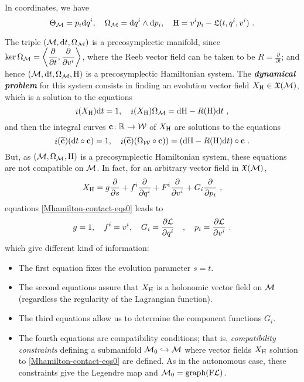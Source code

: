 \documentclass[12pt]{report}
\def\beq{\begin{equation}}
\def\eeq{\end{equation}}
\def\dst{\displaystyle}
\def\derpar#1#2{\frac{\partial{#1}}{\partial{#2}}}
\def\vf{\mathfrak X}
\def\Lag{{\cal L}}
\def\d{{\rm d}}
\def\Real{\mathbb{R}}
\def\inn{\mathop{i}\nolimits}
\begin{document}
In coordinates, we have
$$
\Theta_{\cal M}=p_i\d q^i ,\quad
\Omega_{\cal M}=\d q^i\wedge\d p_i,\quad
{\rm H}=v^ip_i-{\mathfrak L}(t,q^i,v^i) \ .
$$

The triple $({\cal M},\d t,\Omega_{\cal M})$ is a precosymplectic manifold, since
$\dst\ker\Omega_{\cal M}=\left\langle\derpar{}{t},\derpar{}{v^i}\right\rangle$,
where the Reeb vector field can be taken to be
$\dst R=\derpar{}{t}$;
and hence
$({\cal M},\d t,\Omega_{\cal M},{\rm H})$ is a precosymplectic Hamiltonian system.
The {\sl\textbf{dynamical problem}} for this system consists in finding
an evolution vector field $X_{\rm H}\in\vf({\cal M})$,
which is a solution to the equations
\begin{equation}
\label{Mhamilton-contact-eqs0}
\inn(X_{\rm H})\d t=1 ,\quad
\inn(X_{\rm H})\Omega_{\cal M}=\d{\rm H}-R({\rm H})\d t \ ,
\end{equation}
and then the integral curves ${\bf c}\colon\Real\to{\cal W}$
 of $X_{\rm H}$ are solutions to the equations
\begin{equation}
\label{Mhamilton-contact-eqs0b}
\inn(\widetilde{\bf c})(\d t\circ{\bf c})=1 ,\quad
\inn(\widetilde{\bf c})(\Omega_{\cal W}\circ{\bf c}))=\left(\d{\rm H}-R({\rm H})\d t\right)\circ{\bf c} \ .
\end{equation}
But,  as $({\cal M},\Omega_{\cal M},{\rm H})$ is a precosymplectic Hamiltonian system,
these equations are not compatible on ${\cal M}$.
In fact, for an arbitrary vector field in $\vf({\cal M})$,
$$
X_{\rm H} =g\derpar{}{s}+ f^i\derpar{}{q^i}+F^i\derpar{}{v^i}+G_i\derpar{}{p_i} \ ,
$$ 
equations \eqref{Mhamilton-contact-eqs0} leads to
\beq
g= 1 ,\quad
f^i= v^i ,\quad
G_i= \displaystyle \derpar{\Lag}{q^i} \quad ,  \quad
p_i= \derpar{\Lag}{v^i}  \ . 
\label{Mfirstuni}
\eeq
which give different kind of information:
\begin{itemize}
\item
The first equation fixes the evolution parameter $s=t$.
\item
The second equations assure that $X_{\rm H}$ is a holonomic vector field on ${\cal M}$
(regardless the regularity of the Lagrangian function).
\item
The third equations allow us to determine the component functions $G_i$.
\item
The fourth equations are compatibility conditions;
that is, {\sl compatibility constraints} defining a submanifold 
${\cal M}_0\hookrightarrow{\cal M}$
where vector fields $X_{\rm H}$ solution to \eqref{Mhamilton-contact-eqs0} are defined.
As in the autonomous case, these constraints give the Legendre map and ${\cal M}_0={\rm graph}({{\rm F}\Lag})$.
\end{itemize}
\end{document}
